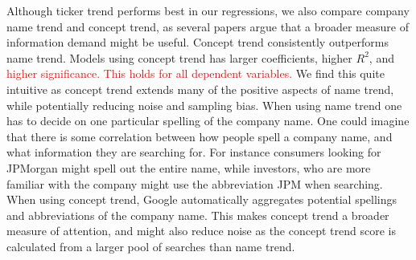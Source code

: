 Although ticker trend performs best in our regressions, we also compare company name trend and concept trend, as several papers argue that a broader measure of information demand might be useful. Concept trend consistently outperforms name trend. Models using concept trend has larger coefficients, higher $R^2$, and \textcolor{red}{ higher significance. This holds for all dependent variables.} We find this quite intuitive as concept trend extends many of the positive aspects of name trend, while potentially reducing noise and sampling bias. When using name trend one has to decide on one particular spelling of the company name. One could imagine that there is some correlation between how people spell a company name, and what information they are searching for. For instance consumers looking for JPMorgan might spell out the entire name, while investors, who are more familiar with the company might use the abbreviation JPM when searching. When using concept trend, Google automatically aggregates potential spellings and abbreviations of the company name. This makes concept trend a broader measure of attention, and might also reduce noise as the concept trend score is calculated from a larger pool of searches than name trend.



